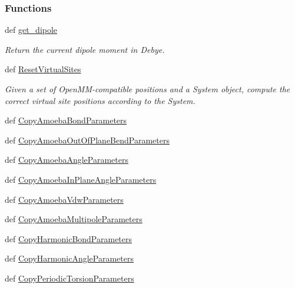 \subsubsection*{Functions}
\begin{DoxyCompactItemize}
\item 
def \hyperlink{namespaceforcebalance_1_1openmmio_a8a2081dcaf027b9b9ab224e22680714d}{get\-\_\-dipole}
\begin{DoxyCompactList}\small\item\em Return the current dipole moment in Debye. \end{DoxyCompactList}\item 
def \hyperlink{namespaceforcebalance_1_1openmmio_af623fa5af97de6c6a0bc5f98ce8db432}{Reset\-Virtual\-Sites}
\begin{DoxyCompactList}\small\item\em Given a set of Open\-M\-M-\/compatible positions and a System object, compute the correct virtual site positions according to the System. \end{DoxyCompactList}\item 
def \hyperlink{namespaceforcebalance_1_1openmmio_a792a195b31612f2140b35927fe28fa1a}{Copy\-Amoeba\-Bond\-Parameters}
\item 
def \hyperlink{namespaceforcebalance_1_1openmmio_a2e95f600757655d41660c25af8fd8e80}{Copy\-Amoeba\-Out\-Of\-Plane\-Bend\-Parameters}
\item 
def \hyperlink{namespaceforcebalance_1_1openmmio_abe9a6b9b200dc8487e56dad7249af3ec}{Copy\-Amoeba\-Angle\-Parameters}
\item 
def \hyperlink{namespaceforcebalance_1_1openmmio_ad0d4739f80f2aab1a861f2e03b8efcd6}{Copy\-Amoeba\-In\-Plane\-Angle\-Parameters}
\item 
def \hyperlink{namespaceforcebalance_1_1openmmio_abe005f73c6dfe9ce1052c9434bcad9be}{Copy\-Amoeba\-Vdw\-Parameters}
\item 
def \hyperlink{namespaceforcebalance_1_1openmmio_a3706c19e71969cabe5782a4535abeffe}{Copy\-Amoeba\-Multipole\-Parameters}
\item 
def \hyperlink{namespaceforcebalance_1_1openmmio_a616f12cc53381716e5fa41f00bf623be}{Copy\-Harmonic\-Bond\-Parameters}
\item 
def \hyperlink{namespaceforcebalance_1_1openmmio_af4ed16f5e2b1cd12bce2f25fab1b05bc}{Copy\-Harmonic\-Angle\-Parameters}
\item 
def \hyperlink{namespaceforcebalance_1_1openmmio_a8f13702754f0b4e43e272139a2ce8341}{Copy\-Periodic\-Torsion\-Parameters}

\end{DoxyCompactItemize}
